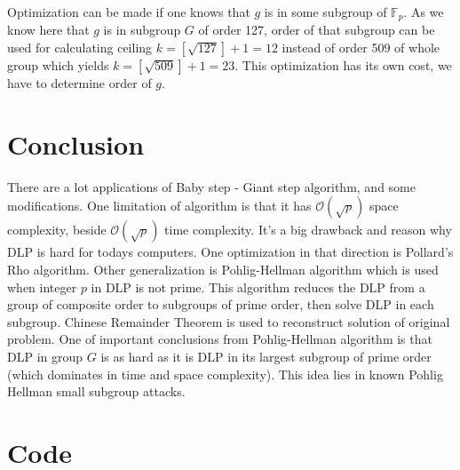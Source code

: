 \documentclass[fleqn,10pt]{olplainarticle}
\begin{document}
Optimization can be made if one knows that $g$ is in some 
subgroup of $\mathbb{F}_p$. As we know here that $g$ is in 
subgroup $G$ of order 127, order of that subgroup can be used 
for calculating ceiling $k=[\sqrt{127}]+1=12$ instead of order 
509 of whole group which yields $k=[\sqrt{509}]+1=23$. 
This optimization has its own cost, we have to determine order 
of $g$.

\section*{Conclusion}

There are a lot applications of Baby step - Giant step algorithm, 
and some modifications. One limitation of algorithm is that it 
has $\mathcal{O}(\sqrt{p})$ space complexity, beside 
$\mathcal{O}(\sqrt{p})$ time complexity. It's a big drawback and 
reason why DLP is hard for todays computers. One optimization 
in that direction is Pollard's Rho algorithm. Other 
generalization is Pohlig-Hellman algorithm which is used when 
integer $p$ in DLP is not prime. This algorithm reduces the DLP 
from a group of composite order to subgroups of prime order, 
then solve DLP in each subgroup. Chinese Remainder Theorem is 
used to reconstruct solution of original problem. One of 
important conclusions from Pohlig-Hellman algorithm is that DLP 
in group $G$ is as hard as it is DLP in its largest subgroup of 
prime order (which dominates in time and space complexity). 
This idea lies in known Pohlig Hellman small subgroup attacks.

\section*{Code}
\end{document}
